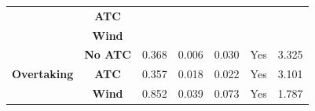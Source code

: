 \begin{table}
\begin{tabular}{|c|c|c|c|c|c|c|}
\cline{2-7}
                                                                                                   & \textbf{ATC}                                                                                      &               &                   &                                                                      &                                                                                                     &                                                                                                      \\ 
\cline{2-7}
                                                                                                   & \textbf{Wind}                                                                                     &                &                   &                                                                      &                                                                                                     &                                                                                                      \\ 
\hline
\multirow{3}{*}{\textbf{Overtaking} }                                                              & \textbf{No ATC}                                                                                   &   0.368             &  0.006                 &  0.030                                                                    &   Yes                                                                                                  &  3.325                                                                                                    \\ 
\cline{2-7}
                                                                                                   & \textbf{ATC}                                                                                      & 0.357          & 0.018             & 0.022                                                                & Yes                                                                                                 & 3.101                                                                                                \\ 
\cline{2-7}
                                                                                                   & \textbf{Wind}                                                                                     & 0.852          & 0.039             & 0.073                                                                & Yes                                                                                                 & 1.787                                                                                                \\
\hline
\end{tabular}
\label{tab:results}
\end{table}

